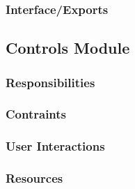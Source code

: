 \subsubsection{Interface/Exports}
\label{sec:exports}


\subsection{Controls Module}
\label{sec:controls_design}

\subsubsection{Responsibilities}
\label{sec:responsibilities}

\subsubsection{Contraints}
\label{sec:constraints}

\subsubsection{User Interactions}
\label{sec:interactions}

\subsubsection{Resources}
\label{sec:resources}

